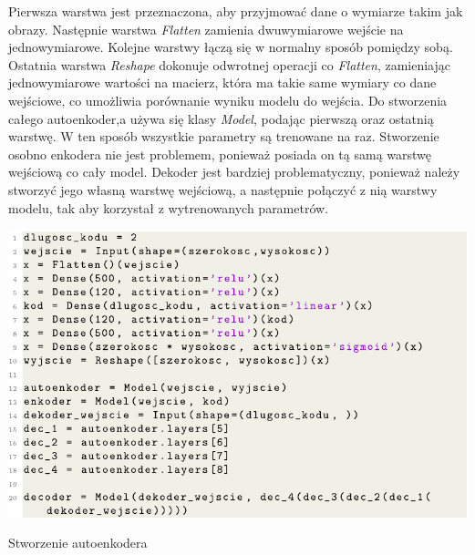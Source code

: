 \documentclass[a4paper,12pt,oneside]{book} %
\begin{document}
Pierwsza warstwa jest przeznaczona, aby przyjmować dane o wymiarze takim jak obrazy. Następnie warstwa \textit{Flatten} zamienia dwuwymiarowe wejście na jednowymiarowe. Kolejne warstwy łączą się w normalny sposób pomiędzy sobą. Ostatnia warstwa \textit{Reshape} dokonuje odwrotnej operacji co \textit{Flatten}, zamieniając jednowymiarowe wartości na macierz, która ma takie same wymiary co dane wejściowe, co umożliwia porównanie wyniku modelu do wejścia. Do stworzenia całego autoenkoder,a używa się klasy \textit{Model}, podając pierwszą oraz ostatnią warstwę. W ten sposób wszystkie parametry są trenowane na raz. Stworzenie osobno enkodera nie jest problemem, ponieważ posiada on tą samą warstwę wejściową co cały model. Dekoder jest bardziej problematyczny, ponieważ należy stworzyć jego własną warstwę wejściową, a następnie połączyć z nią warstwy modelu, tak aby korzystał z wytrenowanych parametrów. 
\begin{code}[h!]
	\centering
	\includegraphics[width=\linewidth]{modelae.pdf}
	\caption{Stworzenie autoenkodera}
	\label{code:createae}
\end{code}
\end{document}
